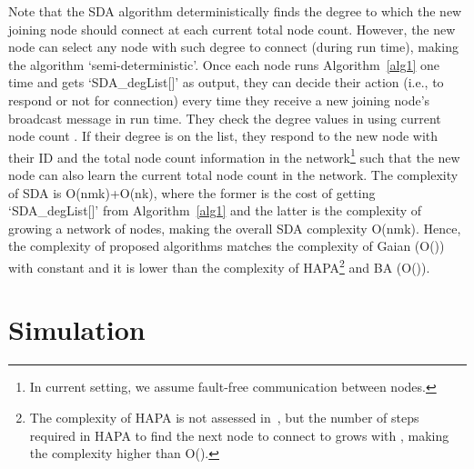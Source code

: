 \documentclass[10pt,journal,cspaper,compsoc]{IEEEtran}
\begin{document}
Note that the SDA algorithm deterministically finds the degree to which the new joining node should connect at each current total node count. However, the new node can select any node with such degree to connect (during run time), making the algorithm `semi-deterministic'. Once each node runs Algorithm~\ref{alg1} one time and gets `SDA\_degList[]' as output, they can decide their action (i.e., to respond or not for connection) every time they receive a new joining node's broadcast message in run time. They check the degree values in    using current node count . If their degree is on the list, they respond to the new node with their ID and the total node count information in the network\footnote{In current setting, we assume fault-free communication between nodes.} such that the new node can also learn the current total node count in the network. The complexity of SDA is O(nmk)+O(nk), where the former is the cost of getting `SDA\_degList[]' from Algorithm~\ref{alg1} and the latter is the complexity of growing a network of  nodes, making the overall SDA complexity O(nmk). Hence, the complexity of proposed algorithms matches the complexity of Gaian (O()) with constant  and it is lower than the complexity of HAPA\footnote{The complexity of HAPA is not assessed in~\cite{guclu}, but the number of steps required in HAPA to find the next node to connect to grows with , making the complexity higher than O().} and BA (O()).








\section{Simulation}
\label{sec:simulation}
\end{document}
